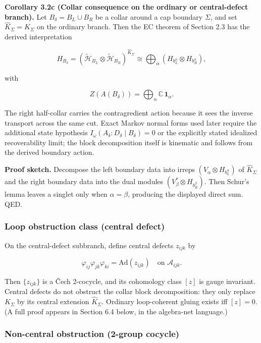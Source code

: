 \textbf{Corollary 3.2c (Collar consequence on the ordinary or central-defect branch).} Let \(B_\delta = B_L \cup B_R\) be a collar around a cap boundary \(\Sigma\), and set \(\widehat K_\Sigma = K_\Sigma\) on the ordinary branch. Then the EC theorem of Section 2.3 has the derived interpretation

\[
H_{B_\delta}
=
(\tilde{\mathcal H}_{B_L}\otimes \tilde{\mathcal H}_{B_R})^{\widehat K_\Sigma}
\cong
\bigoplus_\alpha
(H_{b_L^\alpha}\otimes H_{b_R^\alpha}),
\]

with

\[
Z(A(B_\delta)) = \bigoplus_\alpha \mathbb C\,\mathbf 1_\alpha.
\]

The right half-collar carries the contragredient action because it sees the inverse transport across the same cut. Exact Markov normal forms used later require the additional state hypothesis \(I_\omega(A_\delta:D_\delta \mid B_\delta)=0\) or the explicitly stated idealized recoverability limit; the block decomposition itself is kinematic and follows from the derived boundary action.

\textbf{Proof sketch.} Decompose the left boundary data into irreps \((V_\alpha \otimes H_{b_L^\alpha})\) of \(\widehat K_\Sigma\) and the right boundary data into the dual modules \((V_\beta^* \otimes H_{b_R^\beta})\). Then Schur's lemma leaves a singlet only when \(\alpha=\beta\), producing the displayed direct sum. QED.

\subsubsection{Loop obstruction class (central defect)}\label{33-loop-obstruction-class-central-defect}

On the central-defect subbranch, define central defects \(z_{ijk}\) by

\[
\varphi_{ij} \varphi_{jk} \varphi_{ki} = \mathrm{Ad}(z_{ijk}) \quad \text{on } \mathcal{A}_{ijk}.
\]

Then \(\{z_{ijk}\}\) is a \v{C}ech 2-cocycle, and its cohomology class \([z]\) is gauge invariant. Central defects do not obstruct the collar block decomposition: they only replace \(K_\Sigma\) by its central extension \(\widehat K_\Sigma\). Ordinary loop-coherent gluing exists iff \([z] = 0\). (A full proof appears in Section 6.4 below, in the algebra-net language.)

\subsubsection{Non-central obstruction (2-group cocycle)}\label{34-non-central-obstruction-2-group-cocycle}

